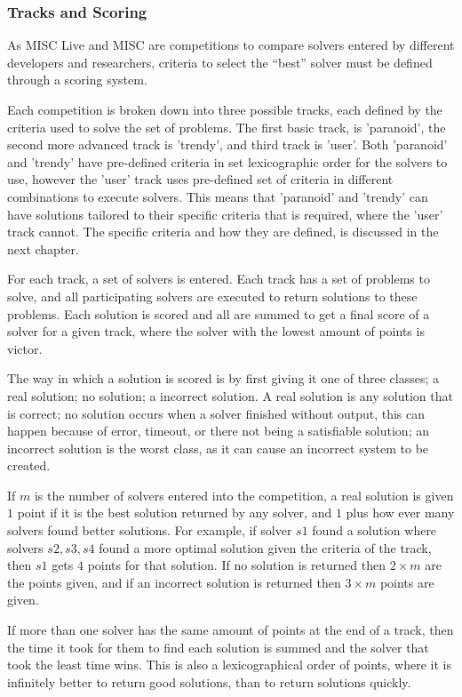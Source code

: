 \subsubsection{Tracks and Scoring}
As MISC Live and MISC are competitions to compare solvers entered by different developers and researchers,
criteria to select the ``best'' solver must be defined through a scoring system.

Each competition is broken down into three possible tracks, each defined by the criteria used to solve the set of problems.
The first basic track, is 'paranoid', the second more advanced track is 'trendy', and third track is 'user'.
Both 'paranoid' and 'trendy' have pre-defined criteria in set lexicographic order for the solvers to use, 
however the 'user' track uses pre-defined set of criteria in different combinations to execute solvers.
This means that 'paranoid' and 'trendy' can have solutions tailored to their specific criteria that is required, where the 'user' track cannot.
The specific criteria and how they are defined, is discussed in the next chapter.

For each track, a set of solvers is entered.
Each track has a set of problems to solve, and all participating solvers are executed to return solutions to these problems.
Each solution is scored and all are summed to get a final score of a solver for a given track, where the solver with the lowest amount of points is victor.

The way in which a solution is scored is by first giving it one of three classes; a real solution; no solution; a incorrect solution.
A real solution is any solution that is correct; no solution occurs when a solver finished without output, this can happen because of error, timeout, or there not being a satisfiable solution;
an incorrect solution is the worst class, as it can cause an incorrect system to be created.

If $m$ is the number of solvers entered into the competition,
a real solution is given $1$ point if it is the best solution returned by any solver, and $1$ plus how ever many solvers found better solutions.
For example, if solver $s1$ found a solution where solvers $s2,s3,s4$ found a more optimal solution given the criteria of the track, then $s1$ gets $4$ points for that solution.
If no solution is returned then $2\times m$ are the points given, and if an incorrect solution is returned then $3 \times m$ points are given.

If more than one solver has the same amount of points at the end of a track, then the time it took for them to find each solution is summed and the solver that took the least time wins.
This is also a lexicographical order of points, where it is infinitely better to return good solutions, than to return solutions quickly.

